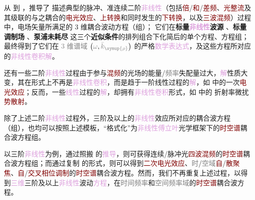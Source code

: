 从  到 ，推导了 {\one} 描述典型的\textcolor{NavyBlue}{脉冲}、\textcolor{NavyBlue}{准连续}二阶\textcolor{Plum}{非线性}（包括\textcolor{Maroon}{倍}/\textcolor{Maroon}{和}/\textcolor{Maroon}{差频}、\textcolor{Maroon}{光整流}及其级联的与之耦合的\textcolor{Maroon}{电光效应}、\textcolor{Maroon}{上转换}和同时发生的\textcolor{Maroon}{下转换}，以及\textcolor{Maroon}{三波混频}）过程中，电场矢量所满足的 3 维耦合波动方程（组）；{\two} 它们在\textbf{标量\textcolor{Plum}{非线性}\textcolor{NavyBlue}{波源}} 、\textbf{标量\textcolor{NavyBlue}{调制场}} 、\textbf{\textbf{\textcolor{NavyBlue}{泵浦未耗尽}}}  这三个\textbf{近似条件}的排列组合下化简后的单个方程、方程组；{\three} 最终得到了它们在 \textcolor{gray}{3 维谱域} $\left( \mathcolor{gray}{\omega}, \mathcolor{gray}{\bar{k}_{\symup{\rho}}} \right)$ 的严格\textcolor{Plum}{数学表达式}，及这些方程所对应的\textcolor{Plum}{非线性卷积解}。

还有一些二阶\textcolor{Plum}{非线性}过程由于参与\textcolor{Maroon}{混频}的光场的\textcolor{NavyBlue}{能量}/\textcolor{gray}{频率}\textcolor{PineGreen}{失配量}过大，\textcolor{Plum}{解}性质大变，其在形式上不再是\textcolor{Plum}{非线性卷积}，而是趋于一阶\textcolor{PineGreen}{线性过程}的\textcolor{Plum}{解}，如  中的一次\textcolor{Maroon}{电光效应}；反而，一些\textcolor{Plum}{线性}过程的\textcolor{Plum}{解}，却拥有\textcolor{Plum}{非线性卷积}形式，如  中的 \textcolor{PineGreen}{折射率}\textcolor{NavyBlue}{微扰}\textcolor{Maroon}{势散射}。

除了上述二阶\textcolor{Plum}{非线性}过程外，三阶及以上的\textcolor{Plum}{非线性}效应所对应的耦合波方程（组），也均可以按照上述模板，“格式化”为\textcolor{Plum}{非线性}\textcolor{Plum}{傅立叶}光学框架下的\textcolor{Maroon}{时空谱}耦合波方程组。

以三阶\textcolor{Plum}{非线性}为例，通过照搬  的\textcolor{Plum}{推导}，则可获得\textcolor{NavyBlue}{连续}/\textcolor{NavyBlue}{脉冲光}\textcolor{Maroon}{四波混频}的\textcolor{Maroon}{时空谱}耦合波方程组；而通过复制  的形式，则可以得到\textcolor{Maroon}{二次电光效应}、\textcolor{gray}{时}/\textcolor{gray}{空域}\textcolor{Maroon}{自}/\textcolor{Maroon}{散聚焦}、\textcolor{Maroon}{自}/\textcolor{Maroon}{交叉相位调制}的\textcolor{Maroon}{时空谱}耦合波方程。然而，我们不再重复上述过程，以得到\textcolor{Plum}{三维}三阶及以上\textcolor{Plum}{非线性}波动\textcolor{Plum}{方程}，在\textcolor{gray}{时间频率}和\textcolor{gray}{空间频率域}的\textcolor{Maroon}{时空谱}耦合波方程。

